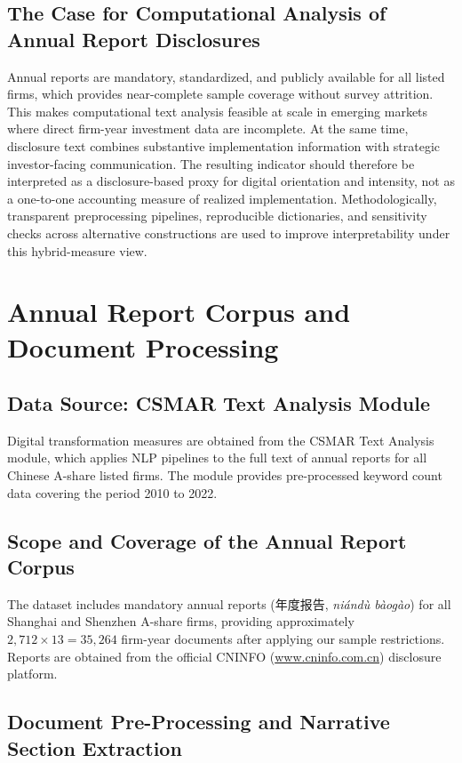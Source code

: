 \subsection{The Case for Computational Analysis of Annual Report Disclosures}

Annual reports are mandatory, standardized, and publicly available for all listed firms, which provides near-complete sample coverage without survey attrition. This makes computational text analysis feasible at scale in emerging markets where direct firm-year investment data are incomplete. At the same time, disclosure text combines substantive implementation information with strategic investor-facing communication. The resulting indicator should therefore be interpreted as a disclosure-based proxy for digital orientation and intensity, not as a one-to-one accounting measure of realized implementation. Methodologically, transparent preprocessing pipelines, reproducible dictionaries, and sensitivity checks across alternative constructions are used to improve interpretability under this hybrid-measure view.

\section{Annual Report Corpus and Document Processing}

\subsection{Data Source: CSMAR Text Analysis Module}

Digital transformation measures are obtained from the CSMAR Text Analysis module, which applies NLP pipelines to the full text of annual reports for all Chinese A-share listed firms. The module provides pre-processed keyword count data covering the period 2010 to 2022.

\subsection{Scope and Coverage of the Annual Report Corpus}

The dataset includes mandatory annual reports (年度报告, \textit{niándù bàogào}) for all Shanghai and Shenzhen A-share firms, providing approximately $2{,}712 \times 13 = 35{,}264$ firm-year documents after applying our sample restrictions. Reports are obtained from the official CNINFO (\url{www.cninfo.com.cn}) disclosure platform.

\subsection{Document Pre-Processing and Narrative Section Extraction}

